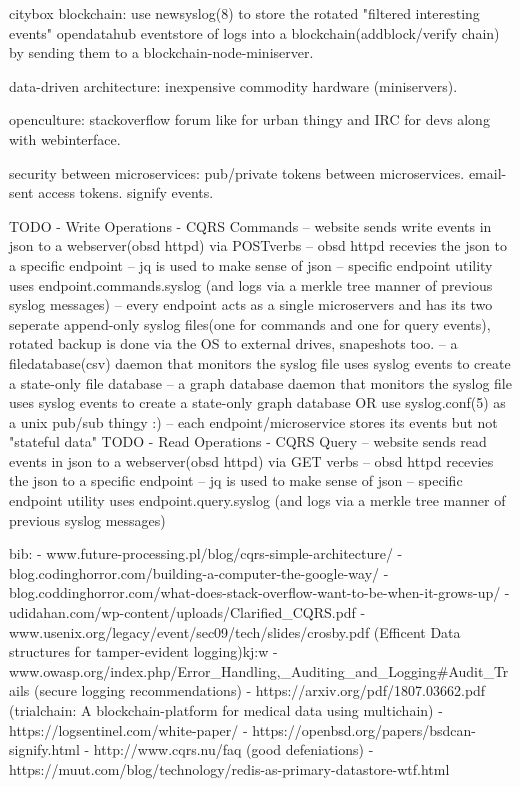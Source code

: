 citybox blockchain: use newsyslog(8) to store the rotated "filtered interesting events" opendatahub eventstore of logs into a blockchain(addblock/verify chain) by sending them to a blockchain-node-miniserver.

data-driven architecture: inexpensive commodity hardware (miniservers).

openculture: stackoverflow forum like for urban thingy and IRC for devs along with webinterface.

security between microservices: 
pub/private tokens between microservices.
email-sent access tokens.
signify events.

TODO
- Write Operations - CQRS Commands
-- website sends write events in json to a webserver(obsd httpd) via POST\PUT verbs
-- obsd httpd recevies the json to a specific endpoint 
-- jq is used to make sense of json
-- specific endpoint utility uses endpoint.commands.syslog (and logs via a merkle tree manner of previous syslog messages)
-- every endpoint acts as a single microservers and has its two seperate append-only syslog files(one for commands and one for query events), rotated backup is done via the OS to external drives, snapeshots too. 
-- a filedatabase(csv) daemon that monitors the syslog file uses syslog events to create a state-only file database 
-- a graph database daemon that monitors the syslog file uses syslog events to create a state-only graph database
OR use 	syslog.conf(5) as a unix pub/sub thingy :)
-- each endpoint/microservice stores its events but not "stateful data" 
TODO
- Read Operations - CQRS Query
-- website sends read events in json to a webserver(obsd httpd) via GET verbs
-- obsd httpd recevies the json to a specific endpoint 
-- jq is used to make sense of json
-- specific endpoint utility uses endpoint.query.syslog (and logs via a merkle tree manner of previous syslog messages)

bib:
- www.future-processing.pl/blog/cqrs-simple-architecture/
- blog.codinghorror.com/building-a-computer-the-google-way/
- blog.coddinghorror.com/what-does-stack-overflow-want-to-be-when-it-grows-up/
- udidahan.com/wp-content/uploads/Clarified_CQRS.pdf
- www.usenix.org/legacy/event/sec09/tech/slides/crosby.pdf (Efficent Data structures for tamper-evident logging)kj:w
- www.owasp.org/index.php/Error_Handling,_Auditing_and_Logging#Audit_Trails (secure logging recommendations) 
- https://arxiv.org/pdf/1807.03662.pdf (trialchain: A blockchain-platform for medical data using multichain)
- https://logsentinel.com/white-paper/
- https://openbsd.org/papers/bsdcan-signify.html
- http://www.cqrs.nu/faq (good defeniations)
- https://muut.com/blog/technology/redis-as-primary-datastore-wtf.html
